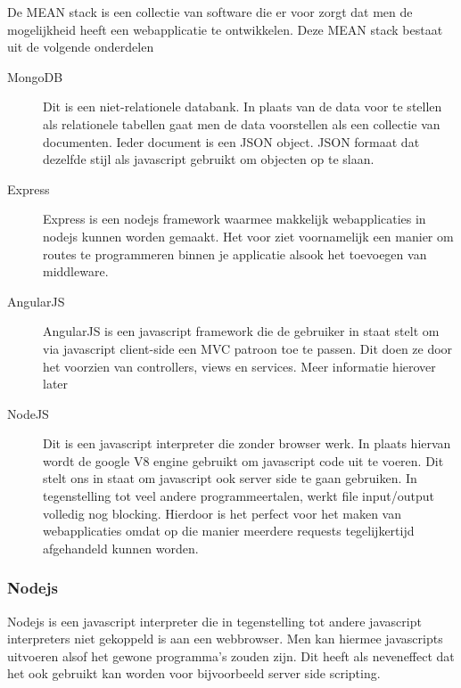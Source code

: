 \documentclass[a4paper,11pt]{article}
\begin{document}
De MEAN stack is een collectie van software die er voor zorgt dat men de mogelijkheid heeft een webapplicatie te ontwikkelen. Deze MEAN stack bestaat uit de volgende onderdelen

\begin{description}
\item[MongoDB] Dit is een niet-relationele databank. In plaats van de data voor te stellen als relationele tabellen gaat men de data voorstellen als een collectie van documenten. Ieder document is een JSON object. JSON formaat dat dezelfde stijl als javascript gebruikt om objecten op te slaan.
\item[Express] Express is een nodejs framework waarmee makkelijk webapplicaties in nodejs kunnen worden gemaakt. Het voor ziet voornamelijk een manier om routes te programmeren binnen je applicatie alsook het toevoegen van middleware.
\item[AngularJS] AngularJS is een javascript framework die de gebruiker in staat stelt om via javascript client-side een MVC patroon toe te passen. Dit doen ze door het voorzien van controllers, views en services. Meer informatie hierover later
\item[NodeJS] Dit is een javascript interpreter die zonder browser werk. In plaats hiervan wordt de google V8 engine gebruikt om javascript code uit te voeren. Dit stelt ons in staat om javascript ook server side te gaan gebruiken. In tegenstelling tot veel andere programmeertalen, werkt file input/output volledig nog blocking. Hierdoor is het perfect voor het maken van webapplicaties omdat op die manier meerdere requests tegelijkertijd afgehandeld kunnen worden.

\end{description}

\subsubsection{Nodejs}
Nodejs is een javascript interpreter die in tegenstelling tot andere javascript interpreters niet gekoppeld is aan een webbrowser. Men kan hiermee javascripts uitvoeren alsof het gewone programma's zouden zijn. Dit heeft als neveneffect dat het ook gebruikt kan worden voor bijvoorbeeld server side scripting.
\end{document}
